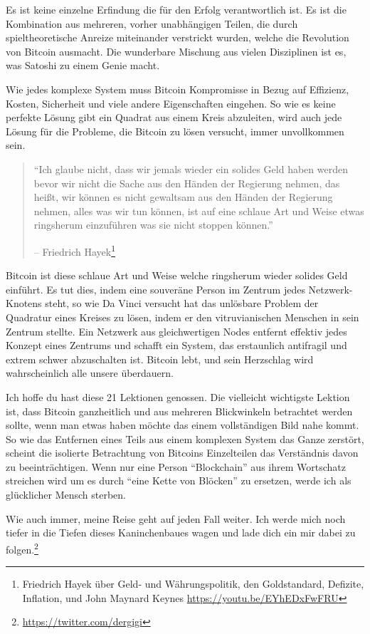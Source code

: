 Es ist keine einzelne Erfindung die für den Erfolg verantwortlich ist. Es ist
die Kombination aus mehreren, vorher unabhängigen Teilen, die durch
spieltheoretische Anreize miteinander verstrickt wurden, welche die Revolution
von Bitcoin ausmacht. Die wunderbare Mischung aus vielen Disziplinen ist es, was
Satoshi zu einem Genie macht.

Wie jedes komplexe System muss Bitcoin Kompromisse in Bezug auf
Effizienz, Kosten, Sicherheit und viele andere Eigenschaften eingehen. So wie es
keine perfekte Lösung gibt ein Quadrat aus einem Kreis abzuleiten, wird auch
jede Lösung für die Probleme, die Bitcoin zu lösen versucht, immer unvollkommen
sein.

\begin{quotation}\begin{samepage}
\enquote{Ich glaube nicht, dass wir jemals wieder ein solides Geld haben werden
bevor wir nicht die Sache aus den Händen der Regierung nehmen, das heißt, wir
können es nicht gewaltsam aus den Händen der Regierung nehmen, alles was wir tun
können, ist auf eine schlaue Art und Weise etwas ringsherum einzuführen was sie
nicht stoppen können.}
\begin{flushright} -- Friedrich Hayek\footnote{Friedrich Hayek über Geld- und
Währungspolitik, den Goldstandard, Defizite, Inflation, und John Maynard Keynes
\url{https://youtu.be/EYhEDxFwFRU}}
\end{flushright}\end{samepage}\end{quotation}

Bitcoin ist diese schlaue Art und Weise welche ringsherum wieder solides Geld
einführt. Es tut dies, indem eine souveräne Person im Zentrum jedes Netzwerk-Knotens steht,
so wie Da Vinci versucht hat das unlösbare Problem der Quadratur eines Kreises
zu lösen, indem er den vitruvianischen Menschen in sein Zentrum stellte. Ein
Netzwerk aus gleichwertigen Nodes entfernt effektiv jedes Konzept eines Zentrums
und schafft ein System, das erstaunlich antifragil und extrem schwer abzuschalten
ist. Bitcoin lebt, und sein Herzschlag wird wahrscheinlich alle unsere
überdauern.

Ich hoffe du hast diese 21 Lektionen genossen. Die vielleicht wichtigste Lektion
ist, dass Bitcoin ganzheitlich und aus mehreren Blickwinkeln betrachtet werden
sollte, wenn man etwas haben möchte das einem vollständigen Bild nahe kommt. So
wie das Entfernen eines Teils aus einem komplexen System das Ganze zerstört,
scheint die isolierte Betrachtung von Bitcoins Einzelteilen das Verständnis
davon zu beeinträchtigen. Wenn nur eine Person \enquote{Blockchain} aus ihrem
Wortschatz streichen wird um es durch \enquote{eine Kette von Blöcken} zu
ersetzen, werde ich als glücklicher Mensch sterben.

Wie auch immer, meine Reise geht auf jeden Fall weiter. Ich werde mich noch
tiefer in die Tiefen dieses Kaninchenbaues wagen und lade dich ein mir dabei zu
folgen.\footnote{\url{https://twitter.com/dergigi}}

%
